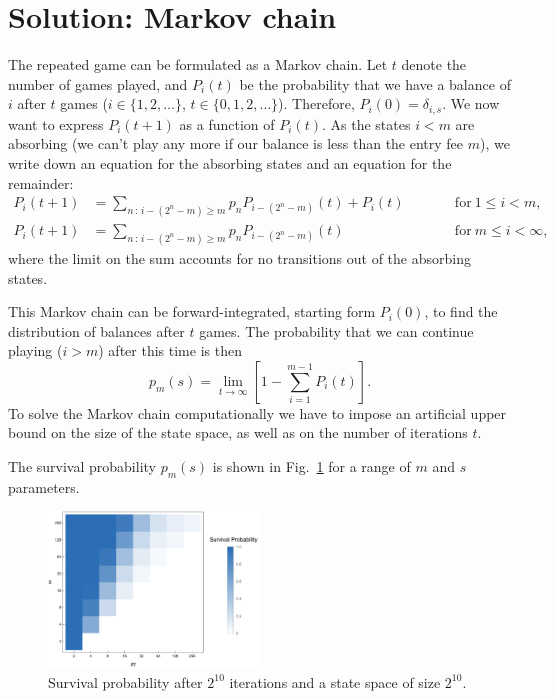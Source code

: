 \documentclass[a4paper,11pt]{article}
\begin{document}
\section*{Solution: Markov chain}
The repeated game can be formulated as a Markov chain.
Let $t$ denote the number of games played, and $P_i(t)$ be the probability that we have a balance of $i$ after $t$ games ($i \in \{1,2,\dots\}$, $t \in \{0,1,2,\dots\}$).
Therefore, $P_i(0) = \delta_{i,s}$.
We now want to express $P_i(t+1)$ as a function of $P_i(t)$.
As the states $i<m$ are absorbing (we can't play any more if our balance is less than the entry fee $m$), we write down an equation for the absorbing states and an equation for the remainder:
\begin{subequations}
\begin{alignat}{2}
P_i(t+1) &= \sum_{n \,:\, i-(2^n-m) \ge m} p_n P_{i-(2^n-m)}(t) + P_i(t) \qquad && \text{for}~ 1 \le i < m, \\
P_i(t+1) &= \sum_{n \,:\, i-(2^n-m) \ge m} p_n P_{i-(2^n-m)}(t) \qquad && \text{for}~ m \le i < \infty,
\end{alignat}
\label{eq:MarkovChain}%
\end{subequations}
where the limit on the sum accounts for no transitions out of the absorbing states.

This Markov chain can be forward-integrated, starting form $P_i(0)$, to find the distribution of balances after $t$ games.
The probability that we can continue playing ($i>m$) after this time is then
\begin{equation}
p_m(s) = \lim_{t\to\infty} \left[1- \sum_{i=1}^{m-1} P_i(t)\right].
\end{equation}
To solve the Markov chain computationally we have to impose an artificial upper bound on the size of the state space, as well as on the number of iterations $t$.

The survival probability $p_m(s)$ is shown in Fig.~\ref{fig:StPetersburgOut} for a range of $m$ and $s$ parameters.

\begin{figure}
\centering
\includegraphics[width=0.5\textwidth]{StPetersburgOut.pdf}
\caption{Survival probability after $2^{10}$ iterations and a state space of size $2^{10}$.}
\label{fig:StPetersburgOut}
\end{figure}
\end{document}
